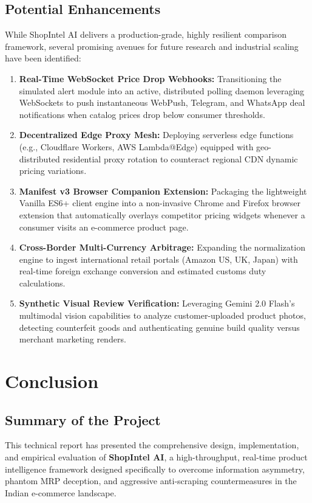 \documentclass[12pt,a4paper,oneside]{report}
\begin{document}
\section{Potential Enhancements}
While ShopIntel AI delivers a production-grade, highly resilient comparison framework, several promising avenues for future research and industrial scaling have been identified:
\begin{enumerate}
    \item \textbf{Real-Time WebSocket Price Drop Webhooks:} Transitioning the simulated alert module into an active, distributed polling daemon leveraging WebSockets to push instantaneous WebPush, Telegram, and WhatsApp deal notifications when catalog prices drop below consumer thresholds.
    \item \textbf{Decentralized Edge Proxy Mesh:} Deploying serverless edge functions (e.g., Cloudflare Workers, AWS Lambda@Edge) equipped with geo-distributed residential proxy rotation to counteract regional CDN dynamic pricing variations.
    \item \textbf{Manifest v3 Browser Companion Extension:} Packaging the lightweight Vanilla ES6+ client engine into a non-invasive Chrome and Firefox browser extension that automatically overlays competitor pricing widgets whenever a consumer visits an e-commerce product page.
    \item \textbf{Cross-Border Multi-Currency Arbitrage:} Expanding the normalization engine to ingest international retail portals (Amazon US, UK, Japan) with real-time foreign exchange conversion and estimated customs duty calculations.
    \item \textbf{Synthetic Visual Review Verification:} Leveraging Gemini 2.0 Flash's multimodal vision capabilities to analyze customer-uploaded product photos, detecting counterfeit goods and authenticating genuine build quality versus merchant marketing renders.
\end{enumerate}

\chapter{Conclusion}

\section{Summary of the Project}
This technical report has presented the comprehensive design, implementation, and empirical evaluation of \textbf{ShopIntel AI}, a high-throughput, real-time product intelligence framework designed specifically to overcome information asymmetry, phantom MRP deception, and aggressive anti-scraping countermeasures in the Indian e-commerce landscape.
\end{document}
